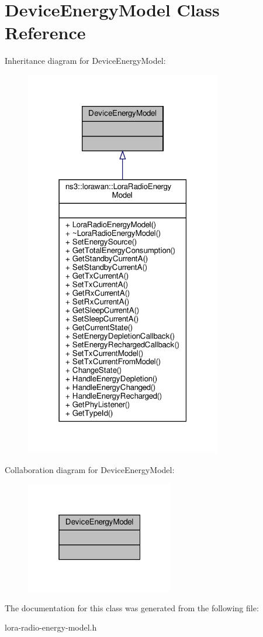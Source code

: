 \hypertarget{classDeviceEnergyModel}{}\section{Device\+Energy\+Model Class Reference}
\label{classDeviceEnergyModel}


Inheritance diagram for Device\+Energy\+Model\+:
\nopagebreak
\begin{figure}[H]
\begin{center}
\leavevmode
\includegraphics[width=243pt]{classDeviceEnergyModel__inherit__graph}
\end{center}
\end{figure}


Collaboration diagram for Device\+Energy\+Model\+:
\nopagebreak
\begin{figure}[H]
\begin{center}
\leavevmode
\includegraphics[width=184pt]{classDeviceEnergyModel__coll__graph}
\end{center}
\end{figure}


The documentation for this class was generated from the following file\+:\begin{DoxyCompactItemize}
\item 
lora-\/radio-\/energy-\/model.\+h\end{DoxyCompactItemize}
